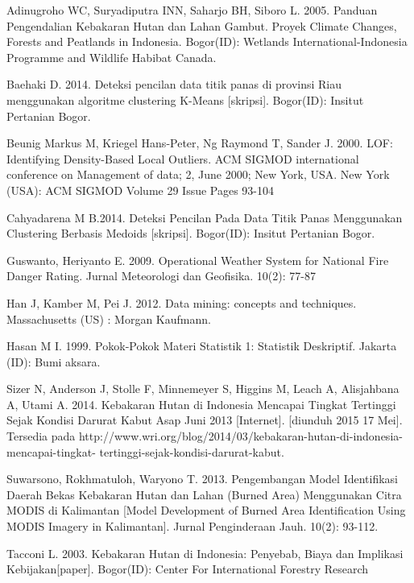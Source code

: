 \begin{thebibliography}{100} %
 Adinugroho WC, Suryadiputra INN, Saharjo BH, Siboro L. 2005. Panduan Pengendalian Kebakaran Hutan dan Lahan Gambut. Proyek Climate Changes, Forests and Peatlands in Indonesia. Bogor(ID): Wetlands International-Indonesia Programme and Wildlife Habibat Canada.

Baehaki D. 2014. Deteksi pencilan data titik panas di provinsi Riau menggunakan algoritme  clustering K-Means [skripsi]. Bogor(ID): Insitut Pertanian Bogor.

Beunig Markus M, Kriegel Hans-Peter, Ng Raymond T, Sander J. 2000. LOF: Identifying Density-Based Local Outliers. ACM SIGMOD international conference on Management  of data; 2, June 2000; New York, USA. New York (USA): ACM SIGMOD Volume 29 Issue Pages 93-104 

Cahyadarena M B.2014. Deteksi Pencilan Pada Data Titik Panas Menggunakan Clustering Berbasis Medoids [skripsi]. Bogor(ID): Insitut Pertanian Bogor.

Guswanto, Heriyanto E. 2009. Operational Weather System for National Fire Danger Rating. Jurnal Meteorologi dan Geofisika. 10(2): 77-87

Han J, Kamber M, Pei J. 2012.  Data mining: concepts and  techniques.  Massachusetts (US) : Morgan Kaufmann.

Hasan M I. 1999. Pokok-Pokok Materi Statistik 1: Statistik Deskriptif. Jakarta (ID): Bumi aksara.

Sizer N, Anderson J, Stolle F, Minnemeyer S, Higgins M, Leach A, Alisjahbana A, Utami A. 2014. Kebakaran Hutan di Indonesia Mencapai Tingkat Tertinggi Sejak Kondisi Darurat Kabut Asap Juni 2013 [Internet]. [diunduh 2015 17 Mei]. Tersedia pada http://www.wri.org/blog/2014/03/kebakaran-hutan-di-indonesia-mencapai-tingkat-  tertinggi-sejak-kondisi-darurat-kabut. 

Suwarsono, Rokhmatuloh, Waryono T. 2013. Pengembangan Model Identifikasi Daerah Bekas Kebakaran Hutan dan Lahan (Burned Area) Menggunakan Citra MODIS di Kalimantan [Model Development of Burned Area Identification Using MODIS Imagery in Kalimantan]. Jurnal Penginderaan Jauh. 10(2): 93-112.

Tacconi L. 2003. Kebakaran Hutan di Indonesia: Penyebab, Biaya dan Implikasi  Kebijakan[paper]. Bogor(ID): Center For International Forestry Research


\vfill\eject


\end{thebibliography}
